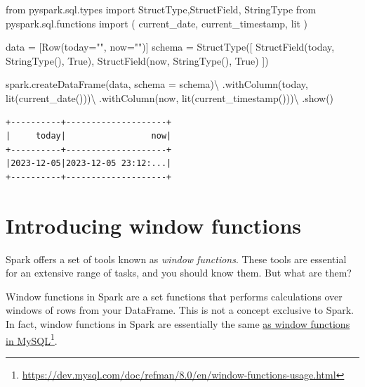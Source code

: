 \documentclass[
  11pt,
  letterpaper,
  DIV=11,
  numbers=noendperiod]{scrreprt}
\newenvironment{Shaded}{\begin{snugshade}}{\end{snugshade}}
\newcommand{\ImportTok}[1]{\textcolor[rgb]{0.00,0.46,0.62}{#1}}
\newcommand{\NormalTok}[1]{\textcolor[rgb]{0.00,0.23,0.31}{#1}}
\newcommand{\OperatorTok}[1]{\textcolor[rgb]{0.37,0.37,0.37}{#1}}
\newcommand{\StringTok}[1]{\textcolor[rgb]{0.13,0.47,0.30}{#1}}
\newcommand{\VariableTok}[1]{\textcolor[rgb]{0.07,0.07,0.07}{#1}}
\begin{document}
\begin{Shaded}
\begin{Highlighting}[]
\ImportTok{from}\NormalTok{ pyspark.sql.types }\ImportTok{import}\NormalTok{ StructType,StructField, StringType}
\ImportTok{from}\NormalTok{ pyspark.sql.functions }\ImportTok{import}\NormalTok{ (}
\NormalTok{    current\_date,}
\NormalTok{    current\_timestamp,}
\NormalTok{    lit}
\NormalTok{)}

\NormalTok{data }\OperatorTok{=}\NormalTok{ [Row(today}\OperatorTok{=}\StringTok{""}\NormalTok{, now}\OperatorTok{=}\StringTok{""}\NormalTok{)]}
\NormalTok{schema }\OperatorTok{=}\NormalTok{ StructType([}
\NormalTok{    StructField(}\StringTok{\textquotesingle{}today\textquotesingle{}}\NormalTok{, StringType(), }\VariableTok{True}\NormalTok{),}
\NormalTok{    StructField(}\StringTok{\textquotesingle{}now\textquotesingle{}}\NormalTok{, StringType(), }\VariableTok{True}\NormalTok{)}
\NormalTok{])}

\NormalTok{spark.createDataFrame(data, schema }\OperatorTok{=}\NormalTok{ schema)}\OperatorTok{\textbackslash{}}
\NormalTok{    .withColumn(}\StringTok{\textquotesingle{}today\textquotesingle{}}\NormalTok{, lit(current\_date()))}\OperatorTok{\textbackslash{}}
\NormalTok{    .withColumn(}\StringTok{\textquotesingle{}now\textquotesingle{}}\NormalTok{, lit(current\_timestamp()))}\OperatorTok{\textbackslash{}}
\NormalTok{    .show()}
\end{Highlighting}
\end{Shaded}

\begin{verbatim}
+----------+--------------------+
|     today|                 now|
+----------+--------------------+
|2023-12-05|2023-12-05 23:12:...|
+----------+--------------------+
\end{verbatim}


\hypertarget{sec-window-functions}{%
\chapter{Introducing window functions}\label{sec-window-functions}}

Spark offers a set of tools known as \emph{window functions}. These
tools are essential for an extensive range of tasks, and you should know
them. But what are them?

Window functions in Spark are a set functions that performs calculations
over windows of rows from your DataFrame. This is not a concept
exclusive to Spark. In fact, window functions in Spark are essentially
the same
\href{https://dev.mysql.com/doc/refman/8.0/en/window-functions-usage.html}{as
window functions in MySQL}\footnote{\url{https://dev.mysql.com/doc/refman/8.0/en/window-functions-usage.html}}.
\end{document}
